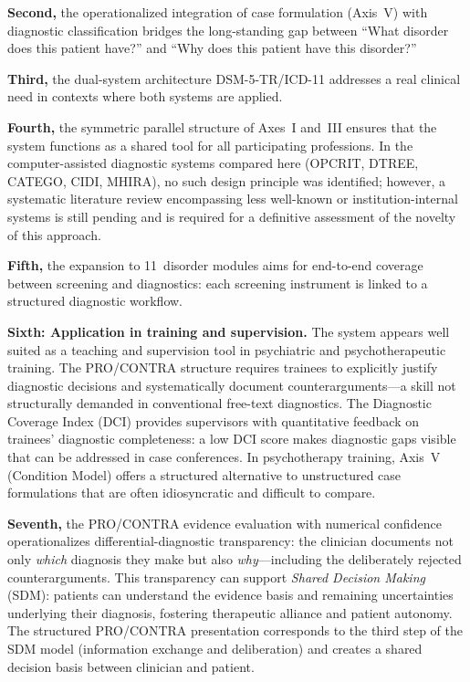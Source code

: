 \documentclass[11pt,a4paper]{article}
\begin{document}
\textbf{Second,} the operationalized integration of case formulation (Axis~V) with diagnostic classification bridges the long-standing gap between ``What disorder does this patient have?'' and ``Why does this patient have this disorder?''

\textbf{Third,} the dual-system architecture DSM-5-TR/ICD-11 addresses a real clinical need in contexts where both systems are applied.

\textbf{Fourth,} the symmetric parallel structure of Axes~I and~III ensures that the system functions as a shared tool for all participating professions. In the computer-assisted diagnostic systems compared here (OPCRIT, DTREE, CATEGO, CIDI, MHIRA), no such design principle was identified; however, a systematic literature review encompassing less well-known or institution-internal systems is still pending and is required for a definitive assessment of the novelty of this approach.

\textbf{Fifth,} the expansion to 11~disorder modules aims for end-to-end coverage between screening and diagnostics: each screening instrument is linked to a structured diagnostic workflow.

\textbf{Sixth: Application in training and supervision.} The system appears well suited as a teaching and supervision tool in psychiatric and psychotherapeutic training. The PRO/CONTRA structure requires trainees to explicitly justify diagnostic decisions and systematically document counterarguments---a skill not structurally demanded in conventional free-text diagnostics. The Diagnostic Coverage Index (DCI) provides supervisors with quantitative feedback on trainees' diagnostic completeness: a low DCI score makes diagnostic gaps visible that can be addressed in case conferences. In psychotherapy training, Axis~V (Condition Model) offers a structured alternative to unstructured case formulations that are often idiosyncratic and difficult to compare.

\textbf{Seventh,} the PRO/CONTRA evidence evaluation with numerical confidence operationalizes differential-diagnostic transparency: the clinician documents not only \textit{which} diagnosis they make but also \textit{why}---including the deliberately rejected counterarguments. This transparency can support \textit{Shared Decision Making} (SDM): patients can understand the evidence basis and remaining uncertainties underlying their diagnosis, fostering therapeutic alliance and patient autonomy. The structured PRO/CONTRA presentation corresponds to the third step of the SDM model (information exchange and deliberation) and creates a shared decision basis between clinician and patient.
\end{document}
